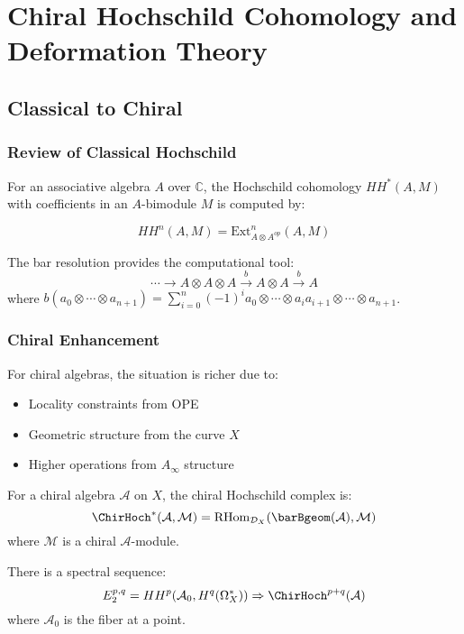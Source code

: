 \chapter{Chiral Hochschild Cohomology and Deformation Theory}

\section{Classical to Chiral}

\subsection{Review of Classical Hochschild}

For an associative algebra $A$ over $\mathbb{C}$, the Hochschild cohomology $HH^*(A, M)$ with coefficients in an $A$-bimodule $M$ is computed by:

$$HH^n(A, M) = \text{Ext}^n_{A \otimes A^{op}}(A, M)$$

The bar resolution provides the computational tool:
$$\cdots \to A \otimes A \otimes A \xrightarrow{b} A \otimes A \xrightarrow{b} A$$
where $b(a_0 \otimes \cdots \otimes a_{n+1}) = \sum_{i=0}^n (-1)^i a_0 \otimes \cdots \otimes a_ia_{i+1} \otimes \cdots \otimes a_{n+1}$.

\subsection{Chiral Enhancement}

For chiral algebras, the situation is richer due to:
\begin{itemize}
\item Locality constraints from OPE
\item Geometric structure from the curve $X$
\item Higher operations from $A_\infty$ structure
\end{itemize}

\begin{definition}
For a chiral algebra $\mathcal{A}$ on $X$, the chiral Hochschild complex is:
$$\ChirHoch^*(\mathcal{A}, \mathcal{M}) = \text{RHom}_{\mathcal{D}_X}(\barBgeom(\mathcal{A}), \mathcal{M})$$
where $\mathcal{M}$ is a chiral $\mathcal{A}$-module.
\end{definition}

\begin{theorem}
There is a spectral sequence:
$$E_2^{p,q} = HH^p(\mathcal{A}_0, H^q(\Omega^*_X)) \Rightarrow \ChirHoch^{p+q}(\mathcal{A})$$
where $\mathcal{A}_0$ is the fiber at a point.
\end{theorem}

